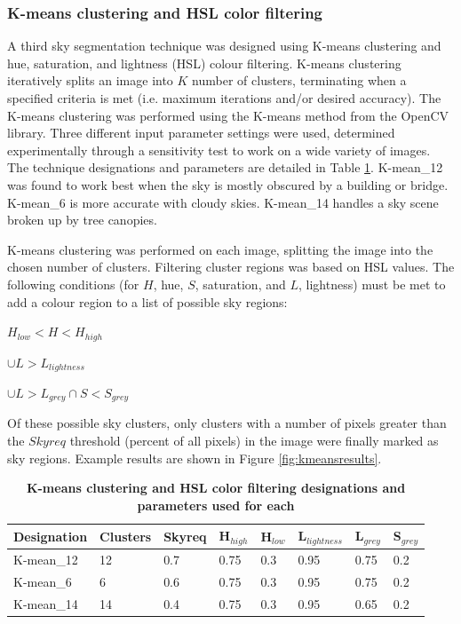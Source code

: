 \documentclass[final,3p,times,authoryear]{elsarticle}
\begin{document}
\subsubsection{K-means clustering and HSL color filtering}\label{sec:kmeans}
A third sky segmentation technique was designed using K-means clustering and hue, saturation, and lightness (HSL) colour filtering. K-means clustering iteratively splits an image into $K$ number of clusters, terminating when a specified criteria is met (i.e. maximum iterations and/or desired accuracy). The K-means clustering was performed using the K-means method from the OpenCV library. Three different input parameter settings were used, determined experimentally through a sensitivity test to work on a wide variety of images. The technique designations and parameters are detailed in Table \ref{tab:techniques3}. K-mean\_12 was found to work best when the sky is mostly obscured by a building or bridge. K-mean\_6 is more accurate with cloudy skies. K-mean\_14 handles a sky scene broken up by tree canopies.

K-means clustering was performed on each image, splitting the image into the chosen number of clusters. Filtering cluster regions was based on HSL values. The following conditions (for $H$, hue, $S$, saturation, and $L$, lightness) must be met to add a colour region to a list of possible sky regions: 

$H_{low} < H < H_{high}$

$\cup L > L_{lightness}$

$\cup L > L_{grey} \cap S < S_{grey}$

Of these possible sky clusters, only clusters with a number of pixels greater than the $Skyreq$ threshold (percent of all pixels) in the image were finally marked as sky regions. Example results are shown in Figure \ref{fig:kmeansresults}. 

\begin{table}[!htbp]
\caption{\bf K-means clustering and HSL color filtering designations and parameters used for each \label{tab:techniques3}}     
\begin{tabular}{ l l l l l l l l}
\textbf{Designation} & \textbf{Clusters} & \textbf{Skyreq}&\textbf{H$_{high}$}&\textbf{H$_{low}$} & \textbf{L$_{lightness}$} & \textbf{L$_{grey}$}& \textbf{S$_{grey}$} \\ \hline
K-mean\_12  & 12 & 0.7& 0.75& 0.3 & 0.95 & 0.75 & 0.2 \\
K-mean\_6  & 6 & 0.6& 0.75& 0.3 & 0.95 & 0.75 & 0.2 \\
K-mean\_14  & 14 & 0.4& 0.75& 0.3 & 0.95 & 0.65 & 0.2 \\
\hline
\end{tabular}
\end{table}
\end{document}
